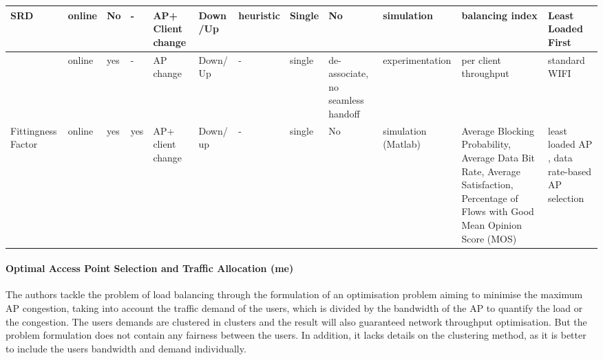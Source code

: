 \documentclass[journal,transmag]{IEEEtran}
\begin{document}
\begin{table}
\begin{tabular} {|p{}|p{.9cm}|p{.9cm}|p{.6cm}|p{.95cm}|p{1.1cm}|p{.6cm}|p{}|p{}|p{} |p{2.3cm}|p{}|}
\scriptsize{SRD \cite{13sociality_aware_AP_slection} } &\scriptsize{online} &\scriptsize{No} &\scriptsize{-} &\scriptsize{AP+ Client change} &\scriptsize{Down /Up} &\scriptsize{heuristic} &\scriptsize{Single} &\scriptsize{No} &\scriptsize{simulation} &\scriptsize{balancing index} &\scriptsize{Least Loaded First}\\\hline

\scriptsize{ \cite{08Design_high_wifi_entreprise}}  &\scriptsize{online} &\scriptsize{yes} &\scriptsize{-} &\scriptsize{AP change} &\scriptsize{Down/ Up} &\scriptsize{-} &\scriptsize{single} &\scriptsize{de-associate, no seamless handoff} &\scriptsize{experimentation} &\scriptsize{per client throughput} &\scriptsize{standard WIFI} \\\hline


\scriptsize{Fittingness Factor \cite{17QOS_AP_selection,16centralised_framework_AP_selection_fittingness_factor}} &\scriptsize{online} &\scriptsize{yes} &\scriptsize{yes} &\scriptsize{AP+ client change} &\scriptsize{Down/ up} &\scriptsize{-} &\scriptsize{single}  &\scriptsize{No} &\scriptsize{simulation (Matlab)} &\scriptsize{Average Blocking Probability, Average Data Bit Rate, Average Satisfaction, Percentage of Flows with Good Mean Opinion Score (MOS)} &\scriptsize{least loaded AP \cite{15dynamic_AP_association_SDN}, data rate-based AP selection \cite{13AP_selection_qos_requirement_variable_channel}}\\\hline



\end{tabular}
\end{table} 



\paragraph{Optimal Access Point Selection and Traffic Allocation \cite{05optimal_AP_selection} (me)}
The authors tackle the problem of load balancing through the formulation of an optimisation problem aiming to minimise the maximum AP congestion, taking into account the traffic demand of the users, which is divided by the bandwidth of the AP to quantify the load or the congestion. The users demands are clustered in clusters and the result will also guaranteed network throughput optimisation. But the problem formulation does not contain any fairness between the users. In addition, it lacks details on the clustering method, as it is better to include the users bandwidth and demand individually.  
\end{document}
